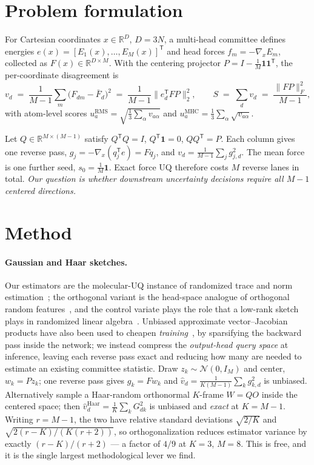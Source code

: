\documentclass{article}
\begin{document}
\section{Problem formulation}
\label{sec:problem}
For Cartesian coordinates $x\in\mathbb{R}^{D}$, $D=3N$, a multi-head committee defines energies
$e(x)=[E_1(x),\dots,E_M(x)]^{\mathsf T}$ and head forces $f_m=-\nabla_x E_m$, collected as
$F(x)\in\mathbb{R}^{D\times M}$. With the centering projector $P = I - \tfrac{1}{M}\mathbf{1}\mathbf{1}^{\mathsf T}$,
the per-coordinate disagreement is
\begin{equation}
v_d \;=\; \frac{1}{M-1}\sum_{m}\bigl(F_{dm}-\bar F_d\bigr)^2 \;=\; \frac{1}{M-1}\bigl\|e_d^{\mathsf T}FP\bigr\|_2^2 ,
\qquad S \;=\; \sum_d v_d \;=\; \frac{\|FP\|_F^2}{M-1},
\end{equation}
with atom-level scores $u_a^{\mathrm{RMS}}=\sqrt{\tfrac13\sum_\alpha v_{a\alpha}}$ and
$u_a^{\mathrm{MHC}}=\tfrac13\sum_\alpha\sqrt{v_{a\alpha}}$.

Let $Q\in\mathbb{R}^{M\times(M-1)}$ satisfy $Q^{\mathsf T}Q=I$, $Q^{\mathsf T}\mathbf 1=0$,
$QQ^{\mathsf T}=P$. Each column gives one reverse pass, $g_j=-\nabla_x(q_j^{\mathsf T}e)=Fq_j$, and
$v_d=\tfrac{1}{M-1}\sum_j g_{j,d}^2$. The mean force is one further seed, $s_0=\tfrac1M\mathbf 1$.
Exact force UQ therefore costs $M$ reverse lanes in total. \emph{Our question is whether downstream
uncertainty decisions require all $M-1$ centered directions.}

\section{Method}
\label{sec:method}
\paragraph{Gaussian and Haar sketches.}
Our estimators are the molecular-UQ instance of randomized trace and norm
estimation~\citep{hutchinson,avron2011,hutchpp}; the orthogonal variant is the head-space analogue of
orthogonal random features~\citep{yu2016orf}, and the control variate plays the role that a low-rank
sketch plays in randomized linear algebra~\citep{halko2011}. Unbiased approximate vector--Jacobian
products have also been used to cheapen \emph{training}~\citep{bakong2026vjp}, by sparsifying the
backward pass inside the network; we instead compress the \emph{output-head query space} at
inference, leaving each reverse pass exact and reducing how many are needed to estimate an existing
committee statistic.
Draw $z_k\sim\mathcal N(0,I_M)$ and center, $w_k=Pz_k$; one reverse pass gives $g_k=Fw_k$ and
$\widehat v_d = \tfrac{1}{K(M-1)}\sum_k g_{k,d}^2$ is unbiased. Alternatively sample a Haar-random
orthonormal $K$-frame $W=QO$ inside the centered space; then
$\widehat v^{\mathrm{Haar}}_d = \tfrac1K\sum_k G_{dk}^2$ is unbiased and \emph{exact} at $K=M-1$.
Writing $r=M-1$, the two have relative standard deviations $\sqrt{2/K}$ and
$\sqrt{2(r-K)/(K(r+2))}$, so orthogonalization reduces estimator variance by exactly
$(r-K)/(r+2)$ --- a factor of $4/9$ at $K{=}3$, $M{=}8$. This is free, and it is the single largest
methodological lever we find.
\end{document}
